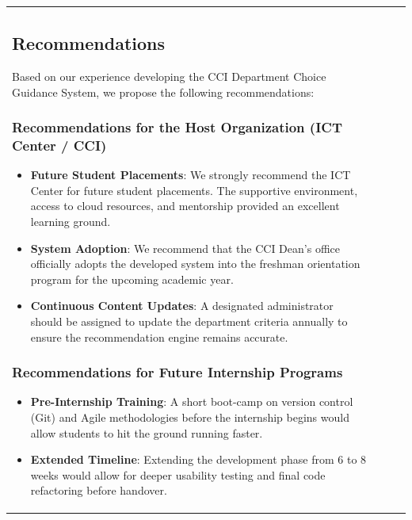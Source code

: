 \documentclass[12pt, a4paper]{article}
\begin{document}
\begin{itemize}[leftmargin=1.5em, itemsep=3pt]
\begin{table}[H]
\begin{tabularx}{\textwidth}{>{\raggedright\arraybackslash}p{0.8cm}>{\raggedright\arraybackslash}p{3.5cm}>{\raggedright\arraybackslash}X>{\raggedright\arraybackslash}p{2.5cm}}
\subsection{Recommendations}
Based on our experience developing the CCI Department Choice Guidance System, we propose the following recommendations:

\subsubsection*{Recommendations for the Host Organization (ICT Center / CCI)}
\begin{itemize}
    \item \textbf{Future Student Placements}: We strongly recommend the ICT Center for future student placements. The supportive environment, access to cloud resources, and mentorship provided an excellent learning ground.
    \item \textbf{System Adoption}: We recommend that the CCI Dean's office officially adopts the developed system into the freshman orientation program for the upcoming academic year.
    \item \textbf{Continuous Content Updates}: A designated administrator should be assigned to update the department criteria annually to ensure the recommendation engine remains accurate.
\end{itemize}

\subsubsection*{Recommendations for Future Internship Programs}
\begin{itemize}
    \item \textbf{Pre-Internship Training}: A short boot-camp on version control (Git) and Agile methodologies before the internship begins would allow students to hit the ground running faster.
    \item \textbf{Extended Timeline}: Extending the development phase from 6 to 8 weeks would allow for deeper usability testing and final code refactoring before handover.
\end{itemize}



\clearpage

\clearpage
\appendix

\end{tabularx}
\end{table}
\end{itemize}
\end{document}
